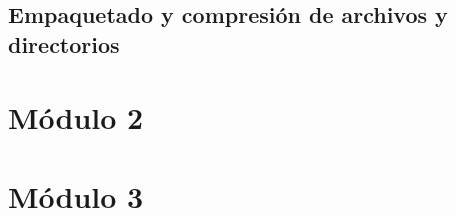 \documentclass{beamer}
\begin{document}
\subsection{Empaquetado y compresión de archivos y directorios}
\section{Módulo 2}












\section{Módulo 3}
\end{document}
